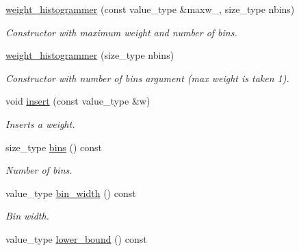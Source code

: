 \begin{DoxyCompactItemize}
\item 
\hypertarget{a00576_a9c9e10ca93b4c307c3c4cbafd5492efd}{\hyperlink{a00576_a9c9e10ca93b4c307c3c4cbafd5492efd}{weight\-\_\-histogrammer} (const value\-\_\-type \&maxw\-\_\-, size\-\_\-type nbins)}\label{a00576_a9c9e10ca93b4c307c3c4cbafd5492efd}

\begin{DoxyCompactList}\small\item\em Constructor with maximum weight and number of bins. \end{DoxyCompactList}\item 
\hypertarget{a00576_adcbbe7cf56320b7404b7cb54d70b15f1}{\hyperlink{a00576_adcbbe7cf56320b7404b7cb54d70b15f1}{weight\-\_\-histogrammer} (size\-\_\-type nbins)}\label{a00576_adcbbe7cf56320b7404b7cb54d70b15f1}

\begin{DoxyCompactList}\small\item\em Constructor with number of bins argument (max weight is taken 1). \end{DoxyCompactList}\item 
void \hyperlink{a00576_ae200d4ddb19e3533d041880372a3bb65}{insert} (const value\-\_\-type \&w)
\begin{DoxyCompactList}\small\item\em Inserts a weight. \end{DoxyCompactList}\item 
\hypertarget{a00576_a25544e42f597dc9e756bcff1f0a36eea}{size\-\_\-type \hyperlink{a00576_a25544e42f597dc9e756bcff1f0a36eea}{bins} () const }\label{a00576_a25544e42f597dc9e756bcff1f0a36eea}

\begin{DoxyCompactList}\small\item\em Number of bins. \end{DoxyCompactList}\item 
\hypertarget{a00576_ad8c1d28bce5747b90651f01801460904}{value\-\_\-type \hyperlink{a00576_ad8c1d28bce5747b90651f01801460904}{bin\-\_\-width} () const }\label{a00576_ad8c1d28bce5747b90651f01801460904}

\begin{DoxyCompactList}\small\item\em Bin width. \end{DoxyCompactList}\item 
\hypertarget{a00576_a1da0126269357ccb03857e8f385363a3}{value\-\_\-type \hyperlink{a00576_a1da0126269357ccb03857e8f385363a3}{lower\-\_\-bound} () const }\label{a00576_a1da0126269357ccb03857e8f385363a3}


\end{DoxyCompactItemize}

